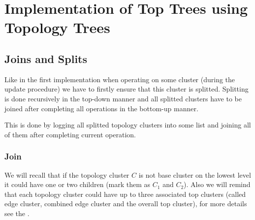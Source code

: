\chapter{Implementation of Top Trees using Topology Trees}
\label{chap:ImplementationTopology}

\section{Joins and Splits}

Like in the first implementation when operating on some cluster (during the
update procedure) we have to firstly ensure that this cluster is splitted.
Splitting is done recursively in the top-down manner and all splitted clusters
have to be joined after completing all operations in the bottom-up manner.

This is done by logging all splitted topology clusters into some list and
joining all of them after completing current operation.

\subsection{Join}

We will recall that if the topology cluster $C$ is not base cluster on the
lowest level it could have one or two children (mark them as $C_1$ and $C_2$).
Also we will remind that each topology cluster could have up to three associated
top clusters (called {\I edge cluster}, {\I combined edge cluster} and the
overall {\I top cluster}), for more details see the .


